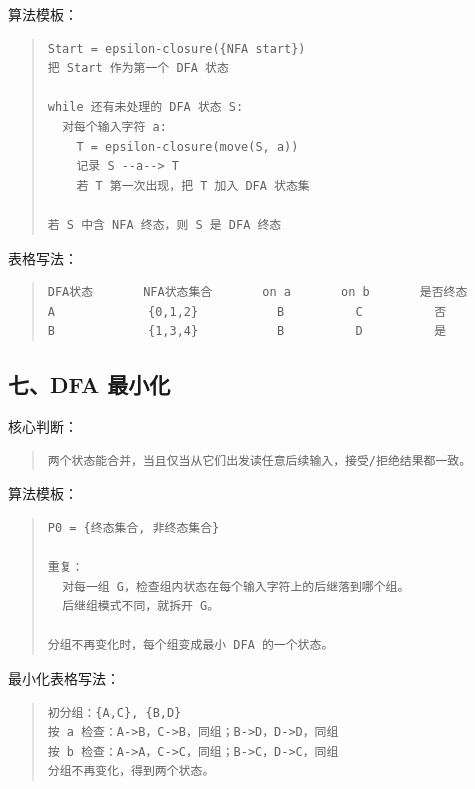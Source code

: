 \documentclass[UTF8,zihao=-4]{ctexart}
\begin{document}
算法模板：


\begin{quote}
\footnotesize
\begin{verbatim}
Start = epsilon-closure({NFA start})
把 Start 作为第一个 DFA 状态

while 还有未处理的 DFA 状态 S:
  对每个输入字符 a:
    T = epsilon-closure(move(S, a))
    记录 S --a--> T
    若 T 第一次出现，把 T 加入 DFA 状态集

若 S 中含 NFA 终态，则 S 是 DFA 终态
\end{verbatim}
\end{quote}


表格写法：


\begin{quote}
\footnotesize
\begin{verbatim}
DFA状态       NFA状态集合       on a       on b       是否终态
A             {0,1,2}           B          C          否
B             {1,3,4}           B          D          是
\end{verbatim}
\end{quote}


\subsection{七、DFA 最小化}


核心判断：


\begin{quote}
\footnotesize
\begin{verbatim}
两个状态能合并，当且仅当从它们出发读任意后续输入，接受/拒绝结果都一致。
\end{verbatim}
\end{quote}


算法模板：


\begin{quote}
\footnotesize
\begin{verbatim}
P0 = {终态集合, 非终态集合}

重复：
  对每一组 G，检查组内状态在每个输入字符上的后继落到哪个组。
  后继组模式不同，就拆开 G。

分组不再变化时，每个组变成最小 DFA 的一个状态。
\end{verbatim}
\end{quote}


最小化表格写法：


\begin{quote}
\footnotesize
\begin{verbatim}
初分组：{A,C}, {B,D}
按 a 检查：A->B，C->B，同组；B->D，D->D，同组
按 b 检查：A->A，C->C，同组；B->C，D->C，同组
分组不再变化，得到两个状态。
\end{verbatim}
\end{quote}
\end{document}
